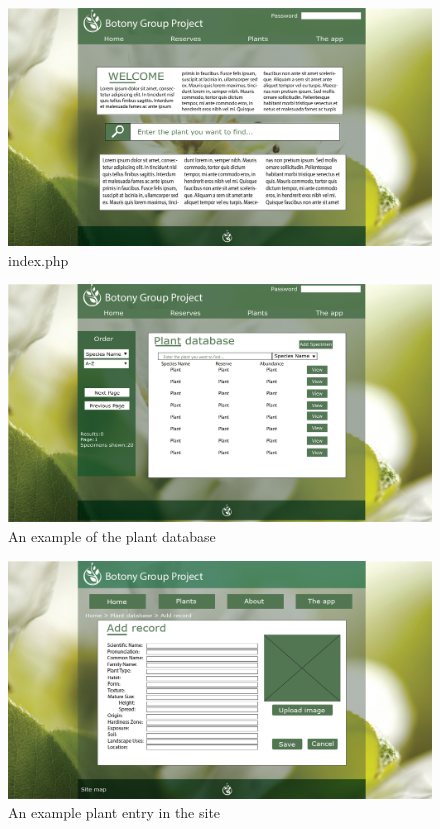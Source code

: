         \begin{landscape}
            \begin{figure}
                \centering
                \includegraphics[scale=0.4]{uiDesign/uiwebimages/index.png}
                \caption{index.php}
                \label{fig:indexWebpage}
            \end{figure}

            \begin{figure}
                \centering
                \includegraphics[scale=0.4]{uiDesign/uiwebimages/plantdb.png}
                \caption{An example of the plant database}
                \label{fig:plantDbWeb}
            \end{figure}

            \begin{figure}
                \centering
                \includegraphics[scale=0.4]{uiDesign/uiwebimages/addrecord.png}
                \caption{An example plant entry in the site}
                \label{fig:viewWeb}
            \end{figure}


\end{landscape}
